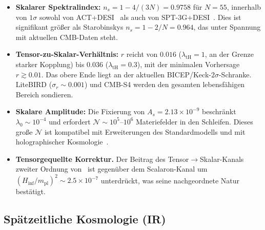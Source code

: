 \documentclass[aps,prd,twocolumn,superscriptaddress,nofootinbib]{revtex4-2}
\begin{document}
\begin{itemize}
\item \textbf{Skalarer Spektralindex:} $n_s = 1 - 4/(3N) = 0.9758$ für $N = 55$, innerhalb von $1\sigma$ sowohl von ACT+DESI~\cite{ACT2025} als auch von SPT-3G+DESI~\cite{SPT3G2026}. Dies ist signifikant größer als Starobinskys $n_s = 1 - 2/N = 0.964$, das unter Spannung mit aktuellen CMB-Daten steht.

\item \textbf{Tensor-zu-Skalar-Verhältnis:} $r$ reicht von $0.016$ ($\lambda_\mathrm{tH} = 1$, an der Grenze starker Kopplung) bis $0.036$ ($\lambda_\mathrm{tH} = 0.3$), mit der minimalen Vorhersage $r \gtrsim 0.01$. Das obere Ende liegt an der aktuellen BICEP/Keck-$2\sigma$-Schranke. LiteBIRD ($\sigma_r \sim 0.001$) und CMB-S4 werden den gesamten lebensfähigen Bereich sondieren.

\item \textbf{Skalare Amplitude:} Die Fixierung von $A_s = 2.13 \times 10^{-9}$ beschränkt $\lambda_0 \sim 10^{-4}$ und erfordert $\mathcal{N} \sim 10^5$--$10^6$ Materiefelder in den Schleifen. Dieses große $\mathcal{N}$ ist kompatibel mit Erweiterungen des Standardmodells und mit holographischer Kosmologie~\cite{Afshordi2017}.

\item \textbf{Tensorgequellte Korrektur.} Der Beitrag des Tensor$\to$Skalar-Kanals zweiter Ordnung von~\cite{Bertacca2025} ist gegenüber dem Scalaron-Kanal um $(H_\mathrm{inf}/m_\mathrm{pl})^2 \sim 2.5 \times 10^{-7}$ unterdrückt, was seine nachgeordnete Natur bestätigt.
\end{itemize}

\subsection{Spätzeitliche Kosmologie (IR)}
\end{document}
